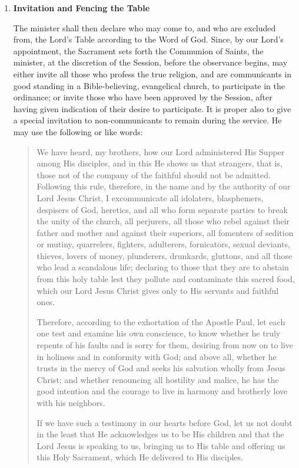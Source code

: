 \documentclass[
]{book}
\begin{document}
\begin{enumerate}
\def\labelenumi{\arabic{enumi}.}
\setcounter{enumi}{3}
\item
  \textbf{Invitation and Fencing the Table}

  The minister shall then declare who may come to, and who are excluded from, the Lord's Table according to the Word of God. Since, by our Lord's appointment, the Sacrament sets forth the Communion of Saints, the minister, at the discretion of the Session, before the observance begins, may either invite all those who profess the true religion, and are communicants in good standing in a Bible-believing, evangelical church, to participate in the ordinance; or invite those who have been approved by the Session, after having given indication of their desire to participate. It is proper also to give a special invitation to non-communicants to remain during the service. He may use the following or like words:

  \begin{quote}
  We have heard, my brothers, how our Lord administered His Supper among His disciples, and in this He shows us that strangers, that is, those not of the company of the faithful should not be admitted. Following this rule, therefore, in the name and by the authority of our Lord Jesus Christ, I excommunicate all idolaters, blasphemers, despisers of God, heretics, and all who form separate parties to break the unity of the church, all perjurers, all those who rebel against their father and mother and against their superiors, all fomenters of sedition or mutiny, quarrelers, fighters, adulterers, fornicators, sexual deviants, thieves, lovers of money, plunderers, drunkards, gluttons, and all those who lead a scandalous life; declaring to those that they are to abstain from this holy table lest they pollute and contaminate this sacred food, which our Lord Jesus Christ gives only to His servants and faithful ones.

  Therefore, according to the exhortation of the Apostle Paul, let each one test and examine his own conscience, to know whether he truly repents of his faults and is sorry for them, desiring from now on to live in holiness and in conformity with God; and above all, whether he trusts in the mercy of God and seeks his salvation wholly from Jesus Christ; and whether renouncing all hostility and malice, he has the good intention and the courage to live in harmony and brotherly love with his neighbors.

  If we have such a testimony in our hearts before God, let us not doubt in the least that He acknowledges us to be His children and that the Lord Jesus is speaking to us, bringing us to His table and offering us this Holy Sacrament, which He delivered to His disciples.


\end{quote}
\end{enumerate}
\end{document}
